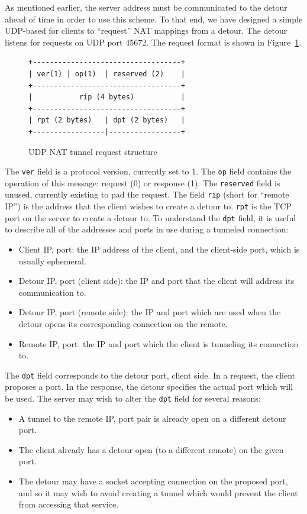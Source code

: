\documentclass{cwru}
\begin{document}
As mentioned earlier, the server address must be communicated to the detour
ahead of time in order to use this scheme. To that end, we have designed a
simple UDP-based for clients to ``request'' NAT mappings from a detour. The
detour listens for requests on UDP port 45672. The request format is shown
in Figure~\ref{fig:udp-nat-packet}.

\begin{figure}
  \centering
\begin{BVerbatim}
+-----------------------------------+
| ver(1) | op(1)  | reserved (2)    |
+-----------------------------------+
|           rip (4 bytes)           |
+-----------------------------------+
| rpt (2 bytes)   | dpt (2 bytes)   |
+-----------------|-----------------+
\end{BVerbatim}
  \caption{UDP NAT tunnel request structure}
  \label{fig:udp-nat-packet}
\end{figure}

The \texttt{ver} field is a protocol version, currently set to 1. The
\texttt{op} field contains the operation of this message: request (0) or
response (1). The \texttt{reserved} field is unused, currently existing to pad
the request. The field \texttt{rip} (short for ``remote IP'') is the address
that the client wishes to create a detour to. \texttt{rpt} is the TCP port on
the server to create a detour to. To understand the \texttt{dpt} field, it is
useful to describe all of the addresses and ports in use during a tunneled
connection:
\begin{itemize}
\item Client IP, port: the IP address of the client, and the client-side port,
  which is usually ephemeral.
\item Detour IP, port (client side): the IP and port that the client will
  address its communication to.
\item Detour IP, port (remote side): the IP and port which are used when the
  detour opens its corresponding connection on the remote.
\item Remote IP, port: the IP and port which the client is tunneling its
  connection to.
\end{itemize}

The \texttt{dpt} field corresponds to the detour port, client side. In a
request, the client proposes a port. In the response, the detour specifies the
actual port which will be used. The server may wish to alter the \texttt{dpt}
field for several reasons:
\begin{itemize}
\item A tunnel to the remote IP, port pair is already open on a different detour
  port.
\item The client already has a detour open (to a different remote) on the given
  port.
\item The detour may have a socket accepting connection on the proposed port,
  and so it may wish to avoid creating a tunnel which would prevent the client
  from accessing that service.
\end{itemize}
\end{document}
